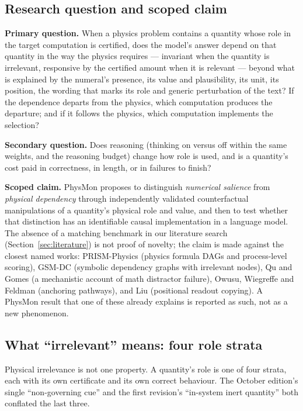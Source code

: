 \documentclass[10pt,a4paper]{article}
\begin{document}
\subsection{Research question and scoped claim}
\label{sec:question}

\textbf{Primary question.} When a physics problem contains a quantity whose role in the target computation is
certified, does the model's answer depend on that quantity in the way the physics requires --- invariant when
the quantity is irrelevant, responsive by the certified amount when it is relevant --- beyond what is explained by
the numeral's presence, its value and plausibility, its unit, its position, the wording that marks its role and
generic perturbation of the text? If the dependence departs from the physics, which computation produces the
departure; and if it follows the physics, which computation implements the selection?

\textbf{Secondary question.} Does reasoning (thinking on versus off within the same weights, and the reasoning
budget) change how role is used, and is a quantity's cost paid in correctness, in length, or in failures to
finish?

\textbf{Scoped claim.} PhysMon proposes to distinguish \emph{numerical salience} from \emph{physical dependency}
through independently validated counterfactual manipulations of a quantity's physical role and value, and then to
test whether that distinction has an identifiable causal implementation in a language model. The absence of a
matching benchmark in our literature search (Section~\ref{sec:literature}) is not proof of novelty; the claim is
made against the closest named works: PRISM-Physics (physics formula DAGs and process-level scoring), GSM-DC
(symbolic dependency graphs with irrelevant nodes), Qu and Gomes (a mechanistic account of math distractor
failure), Owusu, Wiegreffe and Feldman (anchoring pathways), and Liu (positional readout copying). A PhysMon
result that one of these already explains is reported as such, not as a new phenomenon.

\subsection{What ``irrelevant'' means: four role strata}
\label{sec:strata}

Physical irrelevance is not one property. A quantity's role is one of four strata, each with its own certificate
and its own correct behaviour. The October edition's single ``non-governing cue'' and the first revision's
``in-system inert quantity'' both conflated the last three.
\end{document}
